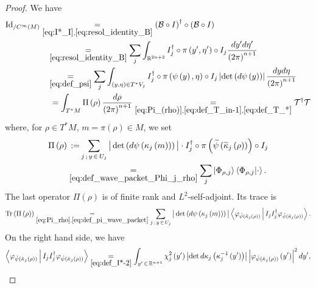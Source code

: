 \documentclass[AHL,Unicode,longabstracts,published]{cedram}
\newcommand{\clT}{\mathcal{T}}
\newcommand{\clB}{\mathcal{B}}
\newcommand{\Id}{\mathrm{Id}}
\newcommand{\Tr}{\mathrm{Tr}}
\newcommand{\bbR}{\mathbb{R}}
\let\oldtilde\tilde
\renewcommand*{\tilde}[1]{\mathchoice{\widetilde{#1}}{\widetilde{#1}}{\oldtilde{#1}}{\oldtilde{#1}}}
\newcommand{\bbR}{\mathbb{R}}
\begin{document}
\begin{proof}
We have
\begin{equation}\label{eq:res_id-1}
\begin{split}
\Id _{/C^{\infty}\left(M\right)} & \underset{\eqref{eq:I*_I},\eqref{eq:resol_identity_B}}{=}\left(\clB\circ I\right)^{\dagger}\circ\left(\clB\circ I\right)
\\
& \mkern16mu\underset{\eqref{eq:resol_identity_B}}{=}\sum_{j}\int_{\bbR^{2n+2}}I_{j}^{\dagger}\circ\pi\left(y',\eta'\right)\circ I_{j}\frac{dy'd\eta'}{\left(2\pi\right)^{n+1}}\\
& \mkern16mu\underset{\eqref{eq:def_psi}}{=}\sum_{j}\int_{\left(y,\eta\right)\in T^{*}V_{j}}I_{j}^{\dagger}\circ\pi\left(\psi\left(y\right),\eta\right)\circ I_{j}\left|\det \left(d\psi\left(y\right)\right)\right|\frac{dyd\eta}{\left(2\pi\right)^{n+1}} \\
& \mkern22mu=\int_{T^{*}M}\Pi\left(\rho\right)\frac{d\rho}{\left(2\pi\right)^{n+1}}\underset{
\eqref{eq:Pi_(rho)},\eqref{eq:def_T_in-1},\eqref{eq:def_T_*}}{=} \clT^{\dagger}\clT
\end{split}
\end{equation}
where, for $\rho\in T^{*}M$, $m=\pi(\rho)\in M$, we set
\begin{equation}\label{eq:Pi_rho}
\begin{split}
\Pi\left(\rho\right) &\mkern8mu{:=}\sum_{j\,;\,y\,\in\,U_{j}}\big|\det \left(d\psi\left(\kappa_{j}\left(m\right)\right)\right)\big|\cdot I_{j}^{\dagger}\circ\pi\left(\tilde{\psi}\left(\tilde{\kappa}_{j}\left(\rho\right)\right)\right)\circ I_{j}
\\
&\underset{\eqref{eq:def_wave_packet_Phi_j_rho}}{=}\sum_{j}\left|\Phi_{\rho,j}\right\rangle\left\langle\Phi_{\rho,j}|\cdot\right\rangle.
\end{split}
\end{equation}
The last operator $\Pi(\rho)$ is of finite rank and $L^{2}$-self-adjoint. Its trace is
\begin{equation}\label{eq:eq}
\Tr\left(\Pi\left(\rho\right)\right)\underset{\eqref{eq:Pi_rho},\eqref{eq:def_pi_wave_packet}}{=} \sum_{j\,;\,y\,\in \,U_{j}}\big|\det \left(d\psi\left(\kappa_{j}\left(m\right)\right)\right)\big|\left\langle\varphi_{\tilde{\psi}\left(\tilde{\kappa}_{j}\left(\rho\right)\right)}\,\middle|\,I_{j}I_{j}^{\dagger}\varphi_{\tilde{\psi}\left(\tilde{\kappa}_{j}\left(\rho\right)\right)}\right\rangle.
\end{equation}
On the right hand side, we have
\begin{align*}
\left\langle\varphi_{\tilde{\psi}\left(\tilde{\kappa}_{j}\left(\rho\right)\right)}\,\middle|\,I_{j}I_{j}^{\dagger}\varphi_{\tilde{\psi}\left(\tilde{\kappa}_{j}\left(\rho\right)\right)}\right\rangle & \underset{\eqref{eq:def_I*-2}}{=}\int_{y'\,\in\,\bbR^{n+1}}\chi_{j}^{2}\left(y'\right)\left|\det d\kappa_{j}\left(\kappa_{j}^{-1}\left(y'\right)\right)\right|\left|\varphi_{\tilde{\psi}\left(\tilde{\kappa}_{j}\left(\rho\right)\right)}\left(y'\right)\right|^{2}dy',\\

\end{align*}
\end{proof}
\end{document}
